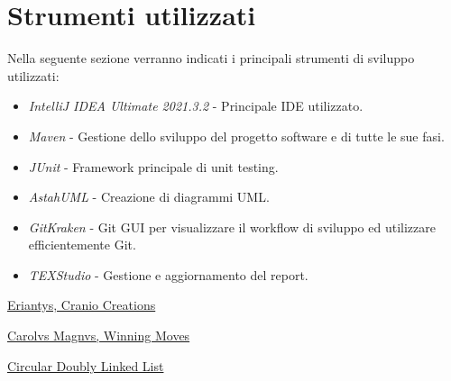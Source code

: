 \documentclass[a4paper, 12pt]{article}
\begin{document}
	\newpage
	\section{Strumenti utilizzati}
	Nella seguente sezione verranno indicati i principali strumenti di sviluppo utilizzati:\\
	\begin{itemize}
		\setlength{\parskip}{0pt}
		\setlength{\parsep}{0pt}
		
		\item \emph{IntelliJ IDEA Ultimate 2021.3.2} - Principale IDE utilizzato.
		\item \emph{Maven} - Gestione dello sviluppo del progetto software e di tutte le sue fasi.
		\item \emph{JUnit} - Framework principale di unit testing.
		\item \emph{AstahUML} - Creazione di diagrammi UML.
		\item \emph{GitKraken} - Git GUI per visualizzare il workflow di sviluppo ed utilizzare efficientemente Git.
		\item \emph{TEXStudio} - Gestione e aggiornamento del report.
	\end{itemize}
	\newpage
	\begin{thebibliography}{99}
		\href{https://www.craniocreations.it/prodotto/eriantys/}{Eriantys, Cranio Creations}
		
		\href{https://www.goblins.net/giochi/carolus-magnus-5071}{Carolvs Magnvs, Winning Moves}
		
		\href{https://www.softwaretestinghelp.com/doubly-linked-list-in-java/#Circular_Doubly_Linked_List_In_Java}{Circular Doubly Linked List}
		
	\end{thebibliography} 
\end{document}
